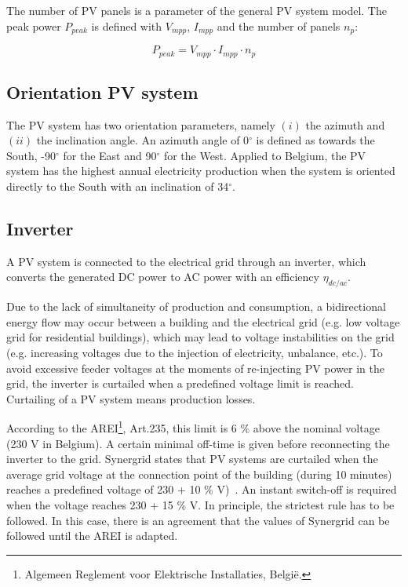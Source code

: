 The number of PV panels is a parameter of the general PV system model. The peak power $P_{peak}$ is defined with $V_{mpp}$, $I_{mpp}$ and the number of panels $n_p$:

\begin{equation}
P_{peak} = V_{mpp} \cdot I_{mpp} \cdot n_p
\label{Ppeak}
\end{equation}

\subsection{Orientation PV system}
The PV system has two orientation parameters, namely $(i)$ the azimuth and $(ii)$ the inclination angle. An azimuth angle of 0$^\circ$ is defined as towards the South, -90$^\circ$ for the East and 90$^\circ$ for the West. Applied to Belgium, the PV system has the highest annual electricity production when the system is oriented directly to the South with an inclination of 34$^\circ$.

\subsection{Inverter}
A PV system is connected to the electrical grid through an inverter, which converts the generated DC power to AC power with an efficiency $\eta_{dc/ac}$.

Due to the lack of simultaneity of production and consumption, a bidirectional energy flow may occur between a building and the electrical grid (e.g. low voltage grid for residential buildings), which may lead to voltage instabilities on the grid (e.g. increasing voltages due to the injection of electricity, unbalance, etc.). To avoid excessive feeder voltages at the moments of re-injecting PV power in the grid, the inverter is curtailed when a predefined voltage limit is reached. Curtailing of a PV system means production losses.

According to the AREI\footnote{Algemeen Reglement voor Elektrische Installaties, Belgi\"e.}, Art.235, this limit is 6 \% above the nominal voltage (230 V in Belgium). A certain minimal off-time is given before reconnecting the inverter to the grid. Synergrid states that PV systems are curtailed when the average grid voltage at the connection point of the building (during 10 minutes) reaches a predefined voltage of 230 + 10 \% V)~\cite{synergrid}. An instant switch-off is required when the voltage reaches 230 + 15 \% V. In principle, the strictest rule has to be followed. In this case, there is an agreement that the values of Synergrid can be followed until the AREI is adapted.

